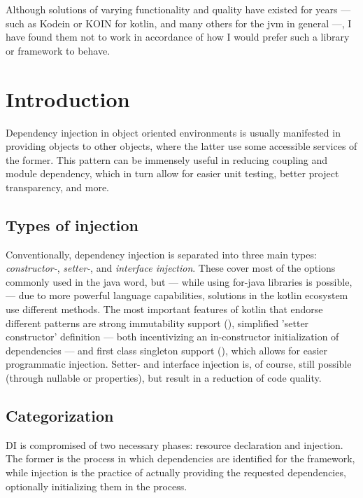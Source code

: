 Although solutions of varying functionality and quality have existed for years --- such as Kodein or KOIN for kotlin, and many others for the jvm in general ---, I have found them not to work in accordance of how I would prefer such a library or framework to behave.

	\section{Introduction}
	
	Dependency injection in object oriented environments is usually manifested in providing objects to other objects, where the latter use some accessible services of the former. This pattern can be immensely useful in reducing coupling and module dependency, which in turn allow for easier unit testing, better project transparency, and more.
	
		\subsection*{Types of injection}
		
		Conventionally, dependency injection is separated into three main types: \emph{constructor-}, \emph{setter-}, and \emph{interface injection}. These cover most of the options commonly used in the java word, but --- while using for-java libraries is possible, --- due to more powerful language capabilities, solutions in the kotlin ecosystem use different methods. The most important features of kotlin that endorse different patterns are strong immutability support (), simplified 'setter constructor' definition --- both incentivizing an in-constructor initialization of dependencies --- and first class singleton support (), which allows for easier programmatic injection. Setter- and interface injection is, of course, still possible (through nullable or  properties), but result in a reduction of code quality.
		
		\subsection*{Categorization}
	
		DI is compromised of two necessary phases: resource declaration and injection. The former is the process in which dependencies are identified for the framework, while injection is the practice of actually providing the requested dependencies, optionally initializing them in the process.
		
